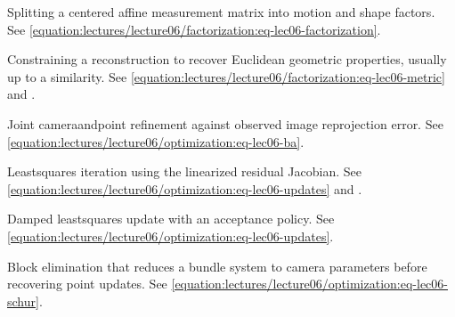 \documentclass[letterpaper,11pt,english,openany,oneside]{jupyterBook}
\begin{document}
\begin{description}
\sphinxAtStartPar
Splitting a centered affine measurement matrix into motion and shape factors. See \eqref{equation:lectures/lecture06/factorization:eq-lec06-factorization}.

\sphinxAtStartPar
Constraining a reconstruction to recover Euclidean geometric properties, usually up to a similarity. See \eqref{equation:lectures/lecture06/factorization:eq-lec06-metric} and {\hyperref[\detokenize{lectures/lecture06/ambiguity:lec06-ambiguity}]{}}.

\sphinxAtStartPar
Joint camera\sphinxhyphen{}and\sphinxhyphen{}point refinement against observed image reprojection error. See \eqref{equation:lectures/lecture06/optimization:eq-lec06-ba}.

\sphinxAtStartPar
Least\sphinxhyphen{}squares iteration using the linearized residual Jacobian. See \eqref{equation:lectures/lecture06/optimization:eq-lec06-updates} and {\hyperref[\detokenize{lectures/lecture06/optimization:ex-lec06-gn}]{}}.

\sphinxAtStartPar
Damped least\sphinxhyphen{}squares update with an acceptance policy. See \eqref{equation:lectures/lecture06/optimization:eq-lec06-updates}.

\sphinxAtStartPar
Block elimination that reduces a bundle system to camera parameters before recovering point updates. See \eqref{equation:lectures/lecture06/optimization:eq-lec06-schur}.


\end{description}
\end{document}
